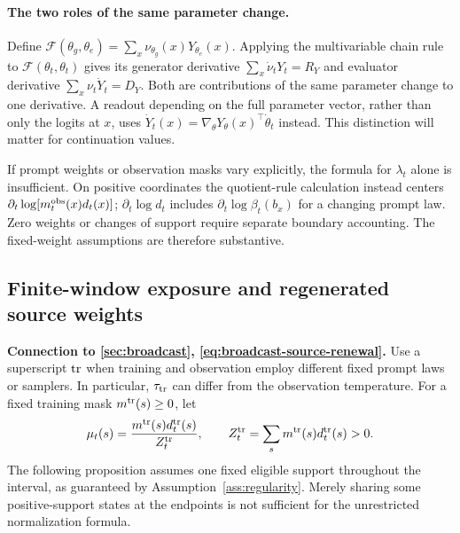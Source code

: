 \paragraph{The two roles of the same parameter change.}
Define $\mathcal F(\theta_g,\theta_e)=\sum_x\nu_{\theta_g}(x)Y_{\theta_e}(x)$. Applying the multivariable chain rule to $\mathcal F(\theta_t,\theta_t)$ gives its generator derivative $\sum_x\dot\nu_tY_t=R_Y$ and evaluator derivative $\sum_x\nu_t\dot Y_t=D_Y$. Both are contributions of the same parameter change to one derivative. A readout depending on the full parameter vector, rather than only the logits at $x$, uses $\dot Y_t(x)=\nabla_\theta Y_\theta(x)^\top\dot\theta_t$ instead. This distinction will matter for continuation values.

If prompt weights or observation masks vary explicitly, the formula for $\lambda_t$ alone is insufficient. On positive coordinates the quotient-rule calculation instead centers $\partial_t\log[m_t^{\rm obs}(x)d_t(x)]$; $\partial_t\log d_t$ includes $\partial_t\log\beta_t(b_x)$ for a changing prompt law. Zero weights or changes of support require separate boundary accounting. The fixed-weight assumptions are therefore substantive.

\subsection{Finite-window exposure and regenerated source weights}
\label{app:broadcast-prefix-reweighting}\label{app:broadcast-finite-window}
\textbf{Connection to \cref{sec:broadcast}, \cref{eq:broadcast-source-renewal}.} Use a superscript ${\rm tr}$ when training and observation employ different fixed prompt laws or samplers. In particular, $\tau_{\rm tr}$ can differ from the observation temperature. For a fixed training mask $m^{\rm tr}(s)\ge0$, let
\[
 \mu_t(s)=\frac{m^{\rm tr}(s)d_t^{\rm tr}(s)}{Z_t^{\rm tr}},\qquad
 Z_t^{\rm tr}=\sum_s m^{\rm tr}(s)d_t^{\rm tr}(s)>0.
\]
The following proposition assumes one fixed eligible support throughout the interval, as guaranteed by Assumption~\ref{ass:regularity}. Merely sharing some positive-support states at the endpoints is not sufficient for the unrestricted normalization formula.

